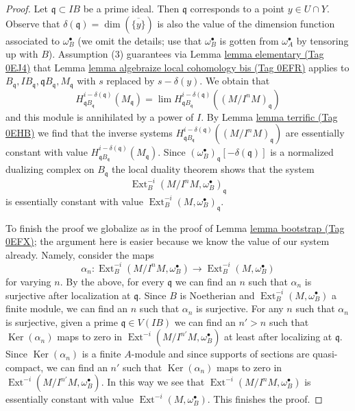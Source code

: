 \documentclass{amsart}
\theoremstyle{plain}
\theoremstyle{definition}
\theoremstyle{remark}
\numberwithin{equation}{subsection}
\def\lim{\mathop{\mathrm{lim}}\nolimits}
\def\Ext{\mathop{\mathrm{Ext}}\nolimits}
\def\Ker{\mathop{\mathrm{Ker}}}
\begin{document}
\begin{proof}
\medskip\noindent
Let $\mathfrak q \subset IB$ be a prime ideal. Then $\mathfrak q$ corresponds
to a point $y \in U \cap Y$. Observe that
$\delta(\mathfrak q) = \dim(\overline{\{y\}})$
is also the value of the dimension function associated to $\omega_B^\bullet$
(we omit the details; use that $\omega_B^\bullet$ is gotten from
$\omega_A^\bullet$ by tensoring up with $B$). Assumption
(3) guarantees via Lemma \href{https://stacks.math.columbia.edu/tag/0EJ4}{lemma elementary (Tag 0EJ4)}
that Lemma \href{https://stacks.math.columbia.edu/tag/0EFR}{lemma algebraize local cohomology bis (Tag 0EFR)}
applies to
$B_\mathfrak q, IB_\mathfrak q, \mathfrak qB_\mathfrak q, M_\mathfrak q$
with $s$ replaced by $s - \delta(y)$. We obtain that
$$
H^{i - \delta(\mathfrak q)}_{\mathfrak qB_\mathfrak q}(M_\mathfrak q) =
\lim H^{i - \delta(\mathfrak q)}_{\mathfrak qB_\mathfrak q}(
(M/I^nM)_\mathfrak q)
$$
and this module is annihilated by a power of $I$.
By Lemma \href{https://stacks.math.columbia.edu/tag/0EHB}{lemma terrific (Tag 0EHB)} we find that the inverse systems
$H^{i - \delta(\mathfrak q)}_{\mathfrak qB_\mathfrak q}((M/I^nM)_\mathfrak q)$
are essentially constant with value
$H^{i - \delta(\mathfrak q)}_{\mathfrak qB_\mathfrak q}(M_\mathfrak q)$.
Since $(\omega_B^\bullet)_\mathfrak q[-\delta(\mathfrak q)]$ is a normalized
dualizing complex on $B_\mathfrak q$ the local duality theorem
shows that the system
$$
\Ext^{-i}_B(M/I^n M, \omega_B^\bullet)_\mathfrak q
$$
is essentially constant with value
$\Ext^{-i}_B(M, \omega_B^\bullet)_\mathfrak q$.

\medskip\noindent
To finish the proof we globalize as in the proof of
Lemma \href{https://stacks.math.columbia.edu/tag/0EFX}{lemma bootstrap (Tag 0EFX)}; the argument here is easier
because we know the value of our system already. Namely, consider the maps
$$
\alpha_n :
\Ext^{-i}_B(M/I^n M, \omega_B^\bullet)
\longrightarrow
\Ext^{-i}_B(M, \omega_B^\bullet)
$$
for varying $n$. By the above, for every $\mathfrak q$ we can find an
$n$ such that $\alpha_n$ is surjective after localization at $\mathfrak q$.
Since $B$ is Noetherian and $\Ext^{-i}_B(M, \omega_B^\bullet)$
a finite module, we can find an $n$ such that $\alpha_n$ is surjective.
For any $n$ such that $\alpha_n$ is surjective, given a prime
$\mathfrak q \in V(IB)$ we can find an $n' > n$ such that
$\Ker(\alpha_n)$ maps to zero in $\Ext^{-i}(M/I^{n'}M, \omega_B^\bullet)$
at least after localizing at $\mathfrak q$.
Since $\Ker(\alpha_n)$ is a finite $A$-module and since supports of
sections are quasi-compact, we can find an $n'$ such that
$\Ker(\alpha_n)$ maps to zero in $\Ext^{-i}(M/I^{n'}M, \omega_B^\bullet)$.
In this way we see that $\Ext^{-i}(M/I^n M, \omega_B^\bullet)$
is essentially constant with value $\Ext^{-i}(M, \omega_B^\bullet)$.
This finishes the proof.
\end{proof}
\end{document}
